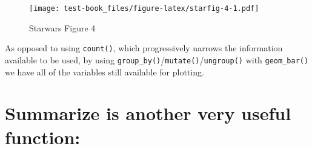 \documentclass[]{book}
\newenvironment{Shaded}{\begin{snugshade}}{\end{snugshade}}
\newcommand{\DataTypeTok}[1]{\textcolor[rgb]{0.13,0.29,0.53}{#1}}
\newcommand{\DecValTok}[1]{\textcolor[rgb]{0.00,0.00,0.81}{#1}}
\newcommand{\KeywordTok}[1]{\textcolor[rgb]{0.13,0.29,0.53}{\textbf{#1}}}
\newcommand{\NormalTok}[1]{#1}
\newcommand{\OperatorTok}[1]{\textcolor[rgb]{0.81,0.36,0.00}{\textbf{#1}}}
\newcommand{\OtherTok}[1]{\textcolor[rgb]{0.56,0.35,0.01}{#1}}
\newcommand{\StringTok}[1]{\textcolor[rgb]{0.31,0.60,0.02}{#1}}
\begin{document}
\begin{Shaded}
\end{Shaded}

\begin{figure}
\centering
\texttt{[image: test-book\_files/figure-latex/starfig-4-1.pdf]}
\caption{\label{fig:starfig-4}Starwars Figure 4}
\end{figure}

As opposed to using \texttt{count()}, which progressively narrows the information available to be used, by using \texttt{group\_by()}/\texttt{mutate()}/\texttt{ungroup()} with \texttt{geom\_bar()} we have all of the variables still available for plotting.

\hypertarget{summarize-is-another-very-useful-function}{%
\section{Summarize is another very useful function:}\label{summarize-is-another-very-useful-function}}

\begin{Shaded}
\end{Shaded}
\end{document}
